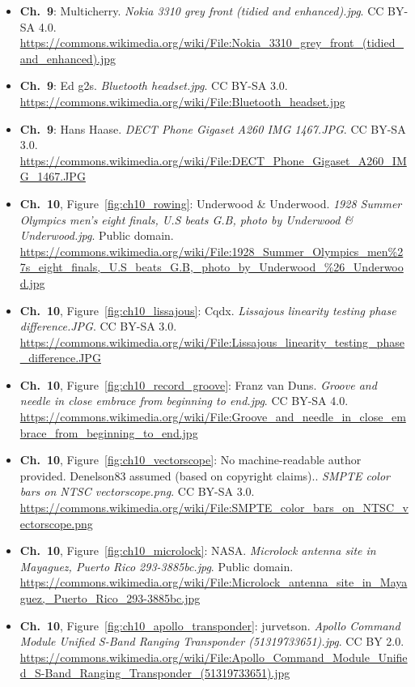 \begin{small}
\begin{itemize}[leftmargin=0pt,itemsep=2pt,label={}]
\item \textbf{Ch.~9}: Multicherry. \emph{Nokia 3310 grey front (tidied and enhanced).\allowbreak{}jpg}. CC BY-SA 4.0. \url{https://commons.wikimedia.org/wiki/File:Nokia_3310_grey_front_(tidied_and_enhanced).jpg}
\item \textbf{Ch.~9}: Ed g2s. \emph{Bluetooth headset.\allowbreak{}jpg}. CC BY-SA 3.0. \url{https://commons.wikimedia.org/wiki/File:Bluetooth_headset.jpg}
\item \textbf{Ch.~9}: Hans Haase. \emph{DECT Phone Gigaset A260 IMG 1467.\allowbreak{}JPG}. CC BY-SA 3.0. \url{https://commons.wikimedia.org/wiki/File:DECT_Phone_Gigaset_A260_IMG_1467.JPG}
\item \textbf{Ch.~10}, Figure~\ref{fig:ch10_rowing}: Underwood \& Underwood. \emph{1928 Summer Olympics men's eight finals, U.\allowbreak{}S beats G.\allowbreak{}B, photo by Underwood \& Underwood.\allowbreak{}jpg}. Public domain. \url{https://commons.wikimedia.org/wiki/File:1928_Summer_Olympics_men%27s_eight_finals,_U.S_beats_G.B,_photo_by_Underwood_%26_Underwood.jpg}
\item \textbf{Ch.~10}, Figure~\ref{fig:ch10_lissajous}: Cqdx. \emph{Lissajous linearity testing phase difference.\allowbreak{}JPG}. CC BY-SA 3.0. \url{https://commons.wikimedia.org/wiki/File:Lissajous_linearity_testing_phase_difference.JPG}
\item \textbf{Ch.~10}, Figure~\ref{fig:ch10_record_groove}: Franz van Duns. \emph{Groove and needle in close embrace from beginning to end.\allowbreak{}jpg}. CC BY-SA 4.0. \url{https://commons.wikimedia.org/wiki/File:Groove_and_needle_in_close_embrace_from_beginning_to_end.jpg}
\item \textbf{Ch.~10}, Figure~\ref{fig:ch10_vectorscope}: No machine-readable author provided. Denelson83 assumed (based on copyright claims).. \emph{SMPTE color bars on NTSC vectorscope.\allowbreak{}png}. CC BY-SA 3.0. \url{https://commons.wikimedia.org/wiki/File:SMPTE_color_bars_on_NTSC_vectorscope.png}
\item \textbf{Ch.~10}, Figure~\ref{fig:ch10_microlock}: NASA. \emph{Microlock antenna site in Mayaguez, Puerto Rico 293-\allowbreak{}3885bc.\allowbreak{}jpg}. Public domain. \url{https://commons.wikimedia.org/wiki/File:Microlock_antenna_site_in_Mayaguez,_Puerto_Rico_293-3885bc.jpg}
\item \textbf{Ch.~10}, Figure~\ref{fig:ch10_apollo_transponder}: jurvetson. \emph{Apollo Command Module Unified S-\allowbreak{}Band Ranging Transponder (51319733651).\allowbreak{}jpg}. CC BY 2.0. \url{https://commons.wikimedia.org/wiki/File:Apollo_Command_Module_Unified_S-Band_Ranging_Transponder_(51319733651).jpg}

\end{itemize}
\end{small}
